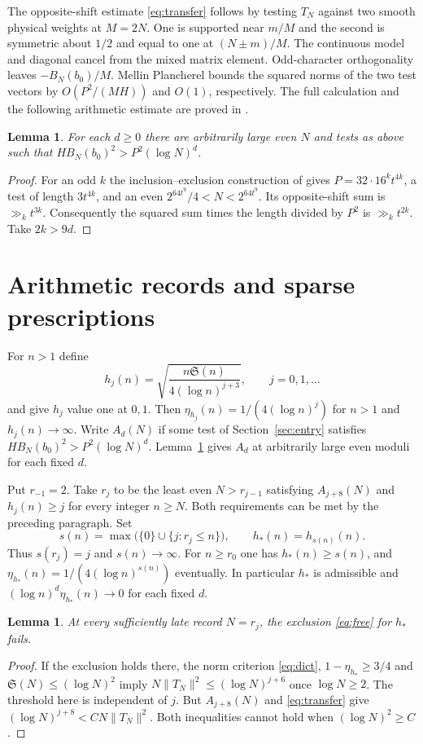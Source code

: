 \documentclass[11pt,a4paper]{article}
\newtheorem{lemma}[theorem]{Lemma}
\newcommand{\SSg}{\mathfrak S}
\begin{document}
The opposite-shift estimate \eqref{eq:transfer} follows by testing $T_N$ against two smooth physical weights at $M=2N$. One is supported near $m/M$ and the second is symmetric about $1/2$ and equal to one at $(N\pm m)/M$. The continuous model and diagonal cancel from the mixed matrix element. Odd-character orthogonality leaves $-B_N(b_0)/M$. Mellin Plancherel bounds the squared norms of the two test vectors by $O(P^2/(MH))$ and $O(1)$, respectively. The full calculation and the following arithmetic estimate are proved in \cite{Rpaper}.

\begin{lemma}\label{lm:arithmetic}
For each $d\ge0$ there are arbitrarily large even $N$ and tests as above such that $HB_N(b_0)^2>P^2(\log N)^d$.
\end{lemma}
\begin{proof}
For an odd $k$ the inclusion--exclusion construction of \cite{Rpaper} gives
$P=32\cdot16^k t^{4k}$, a test of length $3t^{4k}$, and an even $2^{64t^9}/4<N<2^{64t^9}$. Its opposite-shift sum is $\gg_k t^{3k}$. Consequently the squared sum times the length divided by $P^2$ is $\gg_k t^{2k}$. Take $2k>9d$.
\end{proof}
\section{Arithmetic records and sparse prescriptions}\label{sec:records}

For $n>1$ define
\[
 h_j(n)=\sqrt{\frac{n\SSg(n)}{4(\log n)^{j+3}}},\qquad j=0,1,\ldots
\]
and give $h_j$ value one at $0,1$. Then $\eta_{h_j}(n)=1/(4(\log n)^j)$ for $n>1$ and $h_j(n)\to\infty$. Write $A_d(N)$ if some test of Section~\ref{sec:entry} satisfies $HB_N(b_0)^2>P^2(\log N)^d$. Lemma~\ref{lm:arithmetic} gives $A_d$ at arbitrarily large even moduli for each fixed $d$.

Put $r_{-1}=2$. Take $r_j$ to be the least even $N>r_{j-1}$ satisfying $A_{j+8}(N)$ and $h_j(n)\ge j$ for every integer $n\ge N$. Both requirements can be met by the preceding paragraph. Set
\[
 s(n)=\max\bigl(\{0\}\cup\{j:r_j\le n\}\bigr),\qquad h_*(n)=h_{s(n)}(n).
\]
Thus $s(r_j)=j$ and $s(n)\to\infty$. For $n\ge r_0$ one has $h_*(n)\ge s(n)$, and $\eta_{h_*}(n)=1/(4(\log n)^{s(n)})$ eventually. In particular $h_*$ is admissible and $(\log n)^d\eta_{h_*}(n)\to0$ for each fixed $d$.

\begin{lemma}\label{lm:records}
At every sufficiently late record $N=r_j$, the exclusion \eqref{eq:free} for $h_*$ fails.
\end{lemma}
\begin{proof}
If the exclusion holds there, the norm criterion \eqref{eq:dict}, $1-\eta_{h_*}\ge3/4$ and $\SSg(N)\le(\log N)^2$ imply $N\|T_N\|^2\le(\log N)^{j+6}$ once $\log N\ge2$. The threshold here is independent of $j$. But $A_{j+8}(N)$ and \eqref{eq:transfer} give $(\log N)^{j+8}<C N\|T_N\|^2$. Both inequalities cannot hold when $(\log N)^2\ge C$.
\end{proof}
\end{document}

